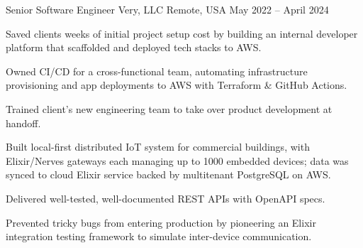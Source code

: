 
\begin{cventries}

	\cventry
	{Senior Software Engineer} %
	{Very, LLC} %
	{Remote, USA} %
	{May 2022 -- April 2024} %
	{
		\begin{cvitems}
			\item Saved clients weeks of initial project setup cost by building an
			internal developer platform that scaffolded and deployed tech stacks to
			AWS.
			\item Owned CI/CD for a cross-functional team, automating infrastructure
			provisioning and app deployments to AWS with Terraform \& GitHub
			Actions.
			\item Trained client's new engineering team to take over product
			development at handoff.
			\item Built local-first distributed IoT system for commercial buildings,
			with Elixir/Nerves gateways each managing up to 1000 embedded devices;
			data was synced to cloud Elixir service backed by multitenant PostgreSQL
			on AWS.
			\item Delivered well-tested, well-documented REST APIs with OpenAPI specs.
			\item Prevented tricky bugs from entering production by pioneering an
			Elixir integration testing framework to simulate inter-device
			communication.

\end{cvitems}}
\end{cventries}
